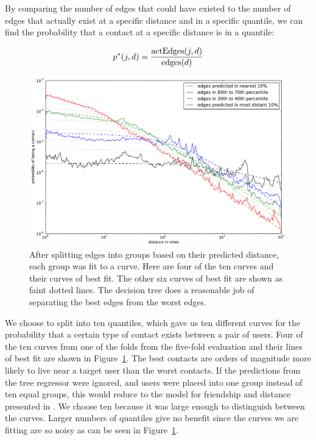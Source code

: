 By comparing the number of edges that could have existed to the number of edges
that actually exist at a specific distance and in a specific quantile, we can
find the probability that a contact at a specific distance is in a quantile:

\[
p^*(j,d) = \frac{\operatorname{actEdges}(j,d)}{\operatorname{edges}(d)}
\]

\begin{figure}[tbh]
\centering
\includegraphics[width=\linewidth]{figures/vect_fit.pdf}
\caption{
After splitting edges into groups based on their predicted distance, each group
was fit to a curve. Here are four of the ten curves and their curves of best
fit. The other six curves of best fit are shown as faint dotted lines. The
decision tree does a reasonable job of separating the best edges from the worst
edges.
}
\label{fig:NearProbFit}
\end{figure}

We choose to split into ten quantiles, which gave us ten different curves for the
probability that a certain type of contact exists between a pair of users.
%
Four of the ten curves from one of the folds from the five-fold evaluation and
their lines of best fit are shown in Figure~\ref{fig:NearProbFit}.
%
The best contacts are orders of magnitude more
likely to live near a target user than the worst contacts.
%
If the predictions from the tree regressor were ignored, and users were placed
into one group instead of ten equal groups, this would reduce to the model
for friendship and distance presented in \cite{backstrom2010find}.
%
We choose ten because it was large enough to distinguish between the curves.
%
Larger numbers of quantiles give no benefit since the curves we are
fitting are so noisy as can be seen in Figure~\ref{fig:NearProbFit}.


